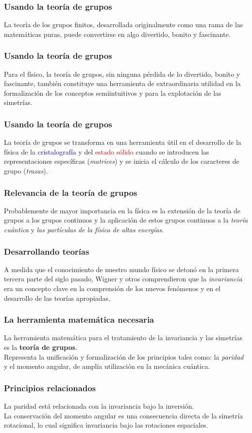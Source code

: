 \documentclass[12pt]{beamer}
\begin{document}
\begin{frame}
\frametitle{Usando la teoría de grupos}
La teoría de los grupos finitos, desarrollada originalmente como una rama de las matemáticas puras, puede convertirse en algo divertido, bonito y fascinante.
\end{frame}
\begin{frame}
\frametitle{Usando la teoría de grupos}    
Para el físico, la teoría de grupos, sin ninguna pérdida de lo divertido, bonito y fascinante, también constituye una herramienta de extraordinaria utilidad en la formalización de los conceptos semiintuitivos y para la explotación de las simetrías.
\end{frame}
\begin{frame}
\frametitle{Usando la teoría de grupos}    
La teoría de grupos se transforma en una herramienta útil en el desarrollo de la física de la \textcolor{blue}{cristalografía} y del \textcolor{red}{estado sólido} cuando se introducen las representaciones específicas (\emph{matrices}) y se inicia el cálculo de los caracteres de grupo (\emph{trazas}).
\end{frame}
\begin{frame}
\frametitle{Relevancia de la teoría de grupos}
Probablemente de mayor importancia en la física es la extensión de la teoría de grupos a los grupos continuos y la aplicación de estos grupos continuos a la \emph{teoría cuántica} y \emph{las partículas de la física de altas energías}.
\end{frame}
\begin{frame}
\frametitle{Desarrollando teorías}
A medida que el conocimiento de nuestro mundo físico se detonó en la primera tercera parte del siglo pasado, Wigner y otros comprendieron que la \emph{invariancia} era un concepto clave en la comprensión de los nuevos fenómenos y en el desarrollo de las teorías apropiadas.
\end{frame}
\begin{frame}
\frametitle{La herramienta matemática necesaria}
La herramienta matemática para el tratamiento de la invariancia y las simetrías es la \textbf{teoría de grupos}.
\\
\bigskip
\pause
Representa la unificación y formalización de los principios tales como: la \emph{paridad} y el \textcolor{OliveGreen}{momento angular}, de amplia utilización en la mecánica cuántica.
\end{frame}
\begin{frame}
\frametitle{Principios relacionados}
La paridad está relacionada con la invariancia bajo la inversión.
\\
\bigskip
\pause
La conservación del momento angular es una consecuencia directa de la simetría rotacional, lo cual significa invariancia bajo las rotaciones espaciales.
\end{frame}
\end{document}
